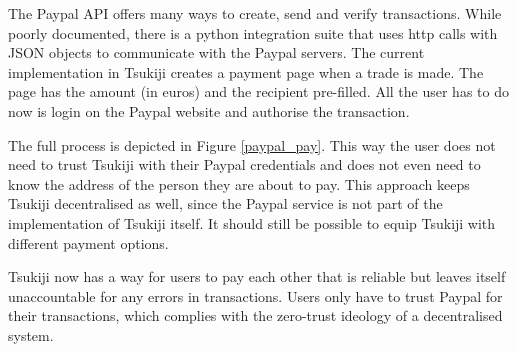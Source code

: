 \newpage
The Paypal API\cite{paypal} offers many ways to create, send and verify transactions.
While poorly documented, there is a python integration suite that uses http calls with JSON objects to communicate with the Paypal servers.
The current implementation in Tsukiji creates a payment page when a trade is made.
The page has the amount (in euros) and the recipient pre-filled.
All the user has to do now is login on the Paypal website and authorise the transaction.

The full process is depicted in Figure \ref{paypal_pay}.
This way the user does not need to trust Tsukiji with their Paypal credentials and does not even need to know the address of the person they are about to pay.
This approach keeps Tsukiji decentralised as well, since the Paypal service is not part of the implementation of Tsukiji itself.
It should still be possible to equip Tsukiji with different payment options.

Tsukiji now has a way for users to pay each other that is reliable but leaves itself unaccountable for any errors in transactions.
Users only have to trust Paypal for their transactions, which complies with the zero-trust ideology of a decentralised system.
